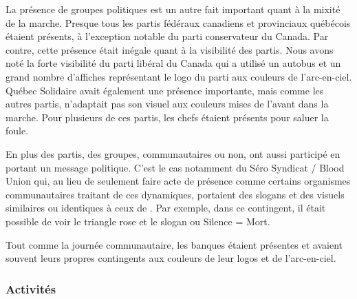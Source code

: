 La présence de groupes politiques est un autre fait important quant à la mixité de la marche.
Presque tous les partis fédéraux canadiens et provinciaux québécois étaient présents, à l'exception notable du parti conservateur du Canada.
Par contre, cette présence était inégale quant à la visibilité des partis.
Nous avons noté la forte visibilité du parti libéral du Canada qui a utilisé un autobus et un grand nombre d'affiches représentant le logo du parti aux couleurs de l'arc-en-ciel.
Québec Solidaire avait également une présence importante, mais comme les autres partis, n'adaptait pas son visuel aux couleurs mises de l'avant dans la marche.
Pour plusieurs de ces partis, les chefs étaient présents pour saluer la foule.

En plus des partis, des groupes, communautaires ou non, ont aussi participé en portant un message politique.
C'est le cas notamment du Séro Syndicat / Blood Union qui, au lieu de seulement faire acte de présence comme certains organismes communautaires traitant de ces dynamiques, portaient des slogans et des visuels similaires ou identiques à ceux de .
Par exemple, dans ce contingent, il était possible de voir le triangle rose et le slogan  ou Silence = Mort.

Tout comme la journée communautaire, les banques étaient présentes et avaient souvent leurs propres contingents aux couleurs de leur logos et de l'arc-en-ciel.
\subsubsection{Activités}
\label{subsec:activitesfiertemontreal}



